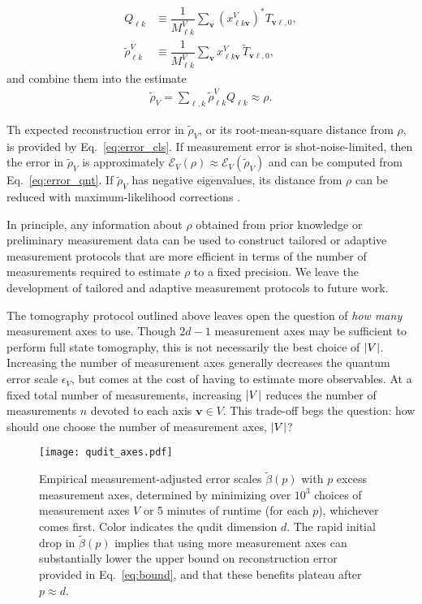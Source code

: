 \documentclass[a4paper,twocolumn,unpublished]{quantumarticle}
\newcommand{\f}[2]{\dfrac{#1}{#2}} %
\newcommand{\p}[1]{\left(#1\right)} %
\newcommand{\E}{\mathcal{E}}
\begin{document}
\begin{enumerate}
  \begin{align}
    Q_{\ell k} &\equiv \f1{M^V_{\ell k}} \sum_{\bm v}
    \p{x^V_{\ell k\bm v}}^* T_{\bm v\ell,0}, \\
    \tilde\rho^V_{\ell k} &\equiv \f1{M^V_{\ell k}} \sum_{\bm v}
    x^V_{\ell k\bm v} \, \tilde T_{\bm v\ell,0},
  \end{align}
  and combine them into the estimate
  \begin{align}
    \tilde\rho_V = \sum_{\ell,k} \tilde\rho^V_{\ell k} Q_{\ell k}
    \approx \rho.
  \end{align}
\end{enumerate}
Th expected reconstruction error in $\tilde\rho_V$, or its root-mean-square distance from $\rho$, is provided by Eq.~\eqref{eq:error_cls}.
If measurement error is shot-noise-limited, then the error in $\tilde\rho_V$ is approximately $\E_V\p{\rho}\approx\E_V\p{\tilde\rho_V}$ and can be computed from Eq.~\eqref{eq:error_qnt}.
If $\tilde\rho_V$ has negative eigenvalues, its distance from $\rho$ can be reduced with maximum-likelihood corrections \cite{smolin2012efficient}.

In principle, any information about $\rho$ obtained from prior knowledge or preliminary measurement data can be used to construct tailored or adaptive measurement protocols \cite{huszar2012adaptive, ferrie2014selfguided, granade2016practical, pereira2018adaptive} that are more efficient in terms of the number of measurements required to estimate $\rho$ to a fixed precision.
We leave the development of tailored and adaptive measurement protocols to future work.

The tomography protocol outlined above leaves open the question of {\it how many} measurement axes to use.
Though $2d-1$ measurement axes may be sufficient to perform full state tomography, this is not necessarily the best choice of $\abs{V}$.
Increasing the number of measurement axes generally decreases the quantum error scale $\epsilon_V$, but comes at the cost of having to estimate more observables.
At a fixed total number of measurements, increasing $\abs{V}$ reduces the number of measurements $n$ devoted to each axis $\bm v\in V$.
This trade-off begs the question: how should one choose the number of measurement axes, $\abs{V}$?

\begin{figure}
  \centering
  \texttt{[image: qudit\_axes.pdf]}
  \caption{Empirical measurement-adjusted error scales $\tilde\beta(p)$ with $p$ excess measurement axes, determined by minimizing over $10^3$ choices of measurement axes $V$ or 5 minutes of runtime (for each $p$), whichever comes first.
    Color indicates the qudit dimension $d$.
    The rapid initial drop in $\tilde\beta(p)$ implies that using more measurement axes can substantially lower the upper bound on reconstruction error provided in Eq.~\eqref{eq:bound}, and that these benefits plateau after $p\approx d$.}
  \label{fig:axes}
\end{figure}
\end{document}
